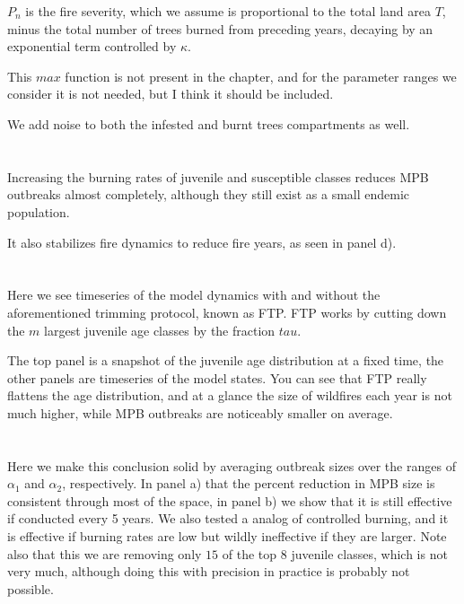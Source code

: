 \documentclass{article}
\begin{document}
$P_n$ is the fire severity, which we assume is proportional to the total land area $T$, minus the total number of trees burned from preceding years, decaying by an exponential term controlled by $\kappa$.

This $max$ function is not present in the chapter, and for the parameter ranges we consider it is not needed, but I think it should be included.

We add noise to both the infested and burnt trees compartments as well.


\section{}

Increasing the burning rates of juvenile and susceptible classes reduces MPB outbreaks almost completely, although they still exist as a small endemic population.

It also stabilizes fire dynamics to reduce fire years, as seen in panel d).

\section{}

Here we see timeseries of the model dynamics with and without the aforementioned trimming protocol, known as FTP. FTP works by cutting down the $m$ largest juvenile age classes by the fraction $tau$.

The top panel is a snapshot of the juvenile age distribution at a fixed time, the other panels are timeseries of the model states. You can see that FTP really flattens the age distribution, and at a glance the size of wildfires each year is not much higher, while MPB outbreaks are noticeably smaller on average.  


\section{}

Here we make this conclusion solid by averaging outbreak sizes over the ranges of $\alpha_1$ and $\alpha_2$, respectively. In panel a) that the percent reduction in MPB size is consistent through most of the space, in panel b) we show that it is still effective if conducted every 5 years. We also tested a analog of controlled burning, and it is effective if burning rates are low but wildly ineffective if they are larger. Note also that this we are removing only $15$ of the top 8 juvenile classes, which is not very much, although doing this with precision in practice is probably not possible. 
\end{document}
